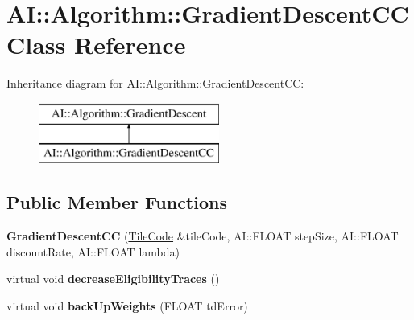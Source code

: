 \hypertarget{classAI_1_1Algorithm_1_1GradientDescentCC}{\section{A\-I\-:\-:Algorithm\-:\-:Gradient\-Descent\-C\-C Class Reference}
\label{classAI_1_1Algorithm_1_1GradientDescentCC}
}
Inheritance diagram for A\-I\-:\-:Algorithm\-:\-:Gradient\-Descent\-C\-C\-:\begin{figure}[H]
\begin{center}
\leavevmode
\includegraphics[height=2.000000cm]{classAI_1_1Algorithm_1_1GradientDescentCC}
\end{center}
\end{figure}
\subsection*{Public Member Functions}
\begin{DoxyCompactItemize}
\item 
\hypertarget{classAI_1_1Algorithm_1_1GradientDescentCC_a036943a3f05d8e9146e833d225b13d74}{{\bfseries Gradient\-Descent\-C\-C} (\hyperlink{classAI_1_1Algorithm_1_1TileCode}{Tile\-Code} \&tile\-Code, A\-I\-::\-F\-L\-O\-A\-T step\-Size, A\-I\-::\-F\-L\-O\-A\-T discount\-Rate, A\-I\-::\-F\-L\-O\-A\-T lambda)}\label{classAI_1_1Algorithm_1_1GradientDescentCC_a036943a3f05d8e9146e833d225b13d74}

\item 
\hypertarget{classAI_1_1Algorithm_1_1GradientDescentCC_a5cd9bd033e8556b4961370da3298cfce}{virtual void {\bfseries decrease\-Eligibility\-Traces} ()}\label{classAI_1_1Algorithm_1_1GradientDescentCC_a5cd9bd033e8556b4961370da3298cfce}

\item 
\hypertarget{classAI_1_1Algorithm_1_1GradientDescentCC_a990c4b429edd9583e0e0a56be43faad8}{virtual void {\bfseries back\-Up\-Weights} (F\-L\-O\-A\-T td\-Error)}\label{classAI_1_1Algorithm_1_1GradientDescentCC_a990c4b429edd9583e0e0a56be43faad8}

\end{DoxyCompactItemize}
